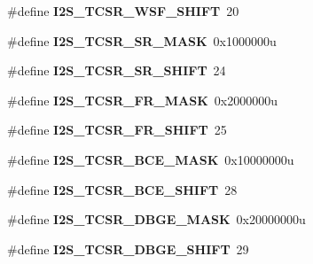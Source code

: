 \begin{DoxyCompactItemize}
\item 
\#define {\bfseries I2\+S\+\_\+\+T\+C\+S\+R\+\_\+\+W\+S\+F\+\_\+\+S\+H\+I\+FT}~20\hypertarget{group__I2S__Register__Masks_gafbec49ae50a286ce9bc59f20cbcd6b4e}{}\label{group__I2S__Register__Masks_gafbec49ae50a286ce9bc59f20cbcd6b4e}

\item 
\#define {\bfseries I2\+S\+\_\+\+T\+C\+S\+R\+\_\+\+S\+R\+\_\+\+M\+A\+SK}~0x1000000u\hypertarget{group__I2S__Register__Masks_ga0f5f12f7b64d57e778e3025ce7cb1294}{}\label{group__I2S__Register__Masks_ga0f5f12f7b64d57e778e3025ce7cb1294}

\item 
\#define {\bfseries I2\+S\+\_\+\+T\+C\+S\+R\+\_\+\+S\+R\+\_\+\+S\+H\+I\+FT}~24\hypertarget{group__I2S__Register__Masks_gab1a40505d50cdd19b7e37eaa0d6cc184}{}\label{group__I2S__Register__Masks_gab1a40505d50cdd19b7e37eaa0d6cc184}

\item 
\#define {\bfseries I2\+S\+\_\+\+T\+C\+S\+R\+\_\+\+F\+R\+\_\+\+M\+A\+SK}~0x2000000u\hypertarget{group__I2S__Register__Masks_gab914972c0af99c736c0873d7c9f325f6}{}\label{group__I2S__Register__Masks_gab914972c0af99c736c0873d7c9f325f6}

\item 
\#define {\bfseries I2\+S\+\_\+\+T\+C\+S\+R\+\_\+\+F\+R\+\_\+\+S\+H\+I\+FT}~25\hypertarget{group__I2S__Register__Masks_gaee3fc16502863ff4fa31702ca5add676}{}\label{group__I2S__Register__Masks_gaee3fc16502863ff4fa31702ca5add676}

\item 
\#define {\bfseries I2\+S\+\_\+\+T\+C\+S\+R\+\_\+\+B\+C\+E\+\_\+\+M\+A\+SK}~0x10000000u\hypertarget{group__I2S__Register__Masks_ga1a283a2875596890e8d014ba29a2d764}{}\label{group__I2S__Register__Masks_ga1a283a2875596890e8d014ba29a2d764}

\item 
\#define {\bfseries I2\+S\+\_\+\+T\+C\+S\+R\+\_\+\+B\+C\+E\+\_\+\+S\+H\+I\+FT}~28\hypertarget{group__I2S__Register__Masks_gabcf492ab7f9cc04accd4b8d144a195d8}{}\label{group__I2S__Register__Masks_gabcf492ab7f9cc04accd4b8d144a195d8}

\item 
\#define {\bfseries I2\+S\+\_\+\+T\+C\+S\+R\+\_\+\+D\+B\+G\+E\+\_\+\+M\+A\+SK}~0x20000000u\hypertarget{group__I2S__Register__Masks_ga168b4f72e1d68208f211020224bc4f1d}{}\label{group__I2S__Register__Masks_ga168b4f72e1d68208f211020224bc4f1d}

\item 
\#define {\bfseries I2\+S\+\_\+\+T\+C\+S\+R\+\_\+\+D\+B\+G\+E\+\_\+\+S\+H\+I\+FT}~29\hypertarget{group__I2S__Register__Masks_ga45053916a88f0ce8d3a0798b7529f976}{}\label{group__I2S__Register__Masks_ga45053916a88f0ce8d3a0798b7529f976}


\end{DoxyCompactItemize}
